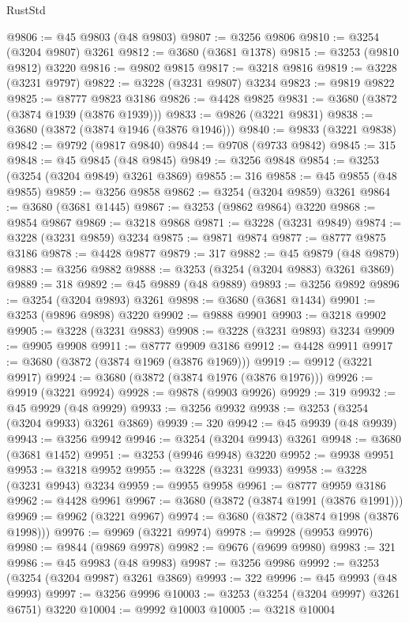 \begin{lexlean}{RustStd}
\begin{coremodule}
@9806 := @45 @9803 (@48 @9803)
@9807 := @3256 @9806
@9810 := @3254 (@3204 @9807) @3261
@9812 := @3680 (@3681 @1378)
@9815 := @3253 (@9810 @9812) @3220
@9816 := @9802 @9815
@9817 := @3218 @9816
@9819 := @3228 (@3231 @9797)
@9822 := @3228 (@3231 @9807) @3234
@9823 := @9819 @9822
@9825 := @8777 @9823 @3186
@9826 := @4428 @9825
@9831 := @3680 (@3872 (@3874 @1939 (@3876 @1939)))
@9833 := @9826 (@3221 @9831)
@9838 := @3680 (@3872 (@3874 @1946 (@3876 @1946)))
@9840 := @9833 (@3221 @9838)
@9842 := @9792 (@9817 @9840)
@9844 := @9708 (@9733 @9842)
@9845 := 315
@9848 := @45 @9845 (@48 @9845)
@9849 := @3256 @9848
@9854 := @3253 (@3254 (@3204 @9849) @3261 @3869)
@9855 := 316
@9858 := @45 @9855 (@48 @9855)
@9859 := @3256 @9858
@9862 := @3254 (@3204 @9859) @3261
@9864 := @3680 (@3681 @1445)
@9867 := @3253 (@9862 @9864) @3220
@9868 := @9854 @9867
@9869 := @3218 @9868
@9871 := @3228 (@3231 @9849)
@9874 := @3228 (@3231 @9859) @3234
@9875 := @9871 @9874
@9877 := @8777 @9875 @3186
@9878 := @4428 @9877
@9879 := 317
@9882 := @45 @9879 (@48 @9879)
@9883 := @3256 @9882
@9888 := @3253 (@3254 (@3204 @9883) @3261 @3869)
@9889 := 318
@9892 := @45 @9889 (@48 @9889)
@9893 := @3256 @9892
@9896 := @3254 (@3204 @9893) @3261
@9898 := @3680 (@3681 @1434)
@9901 := @3253 (@9896 @9898) @3220
@9902 := @9888 @9901
@9903 := @3218 @9902
@9905 := @3228 (@3231 @9883)
@9908 := @3228 (@3231 @9893) @3234
@9909 := @9905 @9908
@9911 := @8777 @9909 @3186
@9912 := @4428 @9911
@9917 := @3680 (@3872 (@3874 @1969 (@3876 @1969)))
@9919 := @9912 (@3221 @9917)
@9924 := @3680 (@3872 (@3874 @1976 (@3876 @1976)))
@9926 := @9919 (@3221 @9924)
@9928 := @9878 (@9903 @9926)
@9929 := 319
@9932 := @45 @9929 (@48 @9929)
@9933 := @3256 @9932
@9938 := @3253 (@3254 (@3204 @9933) @3261 @3869)
@9939 := 320
@9942 := @45 @9939 (@48 @9939)
@9943 := @3256 @9942
@9946 := @3254 (@3204 @9943) @3261
@9948 := @3680 (@3681 @1452)
@9951 := @3253 (@9946 @9948) @3220
@9952 := @9938 @9951
@9953 := @3218 @9952
@9955 := @3228 (@3231 @9933)
@9958 := @3228 (@3231 @9943) @3234
@9959 := @9955 @9958
@9961 := @8777 @9959 @3186
@9962 := @4428 @9961
@9967 := @3680 (@3872 (@3874 @1991 (@3876 @1991)))
@9969 := @9962 (@3221 @9967)
@9974 := @3680 (@3872 (@3874 @1998 (@3876 @1998)))
@9976 := @9969 (@3221 @9974)
@9978 := @9928 (@9953 @9976)
@9980 := @9844 (@9869 @9978)
@9982 := @9676 (@9699 @9980)
@9983 := 321
@9986 := @45 @9983 (@48 @9983)
@9987 := @3256 @9986
@9992 := @3253 (@3254 (@3204 @9987) @3261 @3869)
@9993 := 322
@9996 := @45 @9993 (@48 @9993)
@9997 := @3256 @9996
@10003 := @3253 (@3254 (@3204 @9997) @3261 @6751) @3220
@10004 := @9992 @10003
@10005 := @3218 @10004

\end{coremodule}
\end{lexlean}
